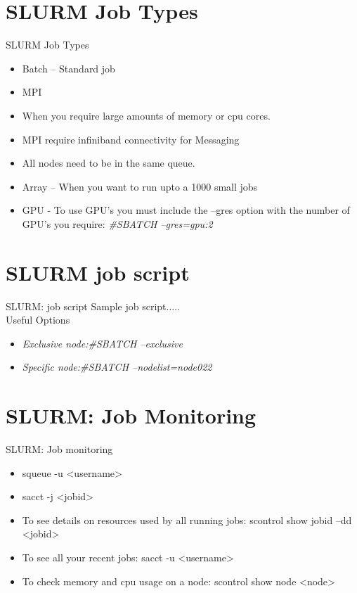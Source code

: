 {\section{SLURM Job Types}
%
\begin{frame}{SLURM Job Types}
\begin{itemize}
\item Batch – Standard job
\item MPI
\item When you require large amounts of memory or cpu cores.
\item MPI require infiniband connectivity for Messaging
\item All nodes need to be in the same queue.
\item Array – When you want to run upto a 1000 small jobs
\item GPU - To use GPU's you must include the –gres option with the number of GPU's you require: \textit{#SBATCH --gres=gpu:2}
\end{itemize}
\end{frame}
}

{
\section{SLURM job script}
%
\begin{frame}{SLURM: job script}
\text Sample job script.....\\

\text Useful Options
\begin{itemize}
\item{\textit{Exclusive node:#SBATCH --exclusive}}
\item{\textit{Specific node:#SBATCH --nodelist=node022}}
\end{itemize} 
\end{frame}
}

{
\section{SLURM: Job Monitoring}
%
\begin{frame}{SLURM: Job monitoring}
\begin{itemize}
\item squeue -u <username>
\item sacct -j <jobid>
\item To see details on resources used by all running jobs: scontrol show jobid –dd <jobid>
\item To see all your recent jobs: sacct -u <username>
\item To check memory and cpu usage on a node: scontrol show node <node>
\end{itemize}
\end{frame}
}

